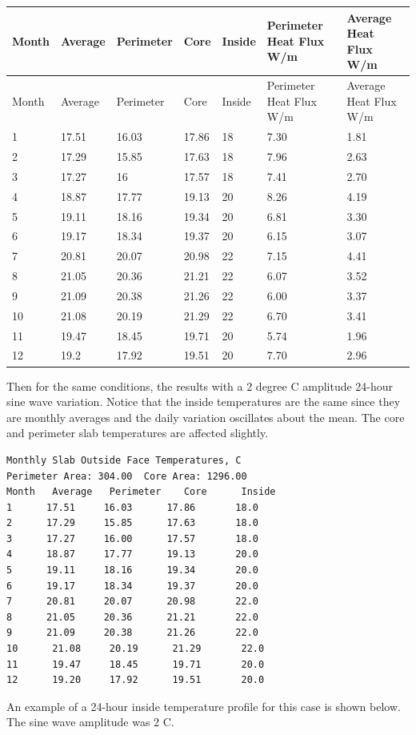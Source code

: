 \begin{longtable}[c]{p{0.85in}p{0.85in}p{0.85in}p{0.85in}p{0.85in}p{0.85in}p{0.85in}}
\toprule 
Month & Average & Perimeter & Core & Inside & Perimeter Heat Flux W/m & Average Heat Flux W/m \tabularnewline \midrule
\endfirsthead

\toprule 
Month & Average & Perimeter & Core & Inside & Perimeter Heat Flux W/m & Average Heat Flux W/m \tabularnewline \midrule
\endhead
1 & 17.51 & 16.03 & 17.86 & 18 & 7.30 & 1.81 \tabularnewline
2 & 17.29 & 15.85 & 17.63 & 18 & 7.96 & 2.63 \tabularnewline
3 & 17.27 & 16 & 17.57 & 18 & 7.41 & 2.70 \tabularnewline
4 & 18.87 & 17.77 & 19.13 & 20 & 8.26 & 4.19 \tabularnewline
5 & 19.11 & 18.16 & 19.34 & 20 & 6.81 & 3.30 \tabularnewline
6 & 19.17 & 18.34 & 19.37 & 20 & 6.15 & 3.07 \tabularnewline
7 & 20.81 & 20.07 & 20.98 & 22 & 7.15 & 4.41 \tabularnewline
8 & 21.05 & 20.36 & 21.21 & 22 & 6.07 & 3.52 \tabularnewline
9 & 21.09 & 20.38 & 21.26 & 22 & 6.00 & 3.37 \tabularnewline
10 & 21.08 & 20.19 & 21.29 & 22 & 6.70 & 3.41 \tabularnewline
11 & 19.47 & 18.45 & 19.71 & 20 & 5.74 & 1.96 \tabularnewline
12 & 19.2 & 17.92 & 19.51 & 20 & 7.70 & 2.96 \tabularnewline
\bottomrule
\end{longtable}

Then for the same conditions, the results with a 2 degree C amplitude 24-hour sine wave variation. Notice that the inside temperatures are the same since they are monthly averages and the daily variation oscillates about the mean. The core and perimeter slab temperatures are affected slightly.

\begin{lstlisting}
Monthly Slab Outside Face Temperatures, C
Perimeter Area: 304.00  Core Area: 1296.00
Month   Average   Perimeter    Core      Inside
1      17.51     16.03      17.86       18.0
2      17.29     15.85      17.63       18.0
3      17.27     16.00      17.57       18.0
4      18.87     17.77      19.13       20.0
5      19.11     18.16      19.34       20.0
6      19.17     18.34      19.37       20.0
7      20.81     20.07      20.98       22.0
8      21.05     20.36      21.21       22.0
9      21.09     20.38      21.26       22.0
10      21.08     20.19      21.29       22.0
11      19.47     18.45      19.71       20.0
12      19.20     17.92      19.51       20.0
\end{lstlisting}

An example of a 24-hour inside temperature profile for this case is shown below. The sine wave amplitude was 2 C.

